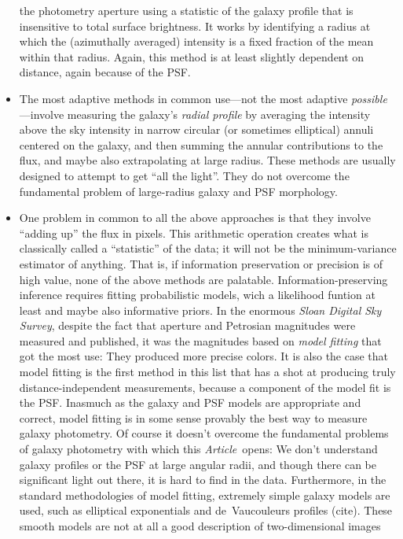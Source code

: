 \documentclass[12pt,preprint,pdftex]{aastex}
\newcommand{\project}[1]{\textsl{#1}}
\newcommand{\documentname}{\textsl{Article}}
\begin{document}
\begin{itemize}
  the photometry aperture using a statistic of the galaxy profile that
  is insensitive to total surface brightness.  It works by identifying
  a radius at which the (azimuthally averaged) intensity is a fixed
  fraction of the mean within that radius.  Again, this method is at
  least slightly dependent on distance, again because of the PSF.
\item The most adaptive methods in common use---not the most adaptive
  \emph{possible}---involve measuring the galaxy's \emph{radial
    profile} by averaging the intensity above the sky intensity in
  narrow circular (or sometimes elliptical) annuli centered on the
  galaxy, and then summing the annular contributions to the flux, and
  maybe also extrapolating at large radius.  These methods are usually
  designed to attempt to get ``all the light''.  They do not overcome
  the fundamental problem of large-radius galaxy and PSF morphology.
\item One problem in common to all the above approaches is that they
  involve ``adding up'' the flux in pixels.  This arithmetic operation
  creates what is classically called a ``statistic'' of the data; it
  will not be the minimum-variance estimator of anything.  That is, if
  information preservation or precision is of high value, none of the
  above methods are palatable.  Information-preserving inference
  requires fitting probabilistic models, wich a likelihood funtion at
  least and maybe also informative priors.  In the enormous
  \project{Sloan Digital Sky Survey}, despite the fact that aperture
  and Petrosian magnitudes were measured and published, it was the
  magnitudes based on \emph{model fitting} that got the most use: They
  produced more precise colors.  It is also the case that model
  fitting is the first method in this list that has a shot at
  producing truly distance-independent measurements, because a
  component of the model fit is the PSF.  Inasmuch as the galaxy and
  PSF models are appropriate and correct, model fitting is in some
  sense provably the best way to measure galaxy photometry.  Of course
  it doesn't overcome the fundamental problems of galaxy photometry
  with which this \documentname\ opens: We don't understand galaxy
  profiles or the PSF at large angular radii, and though there can be
  significant light out there, it is hard to find in the data.
  Furthermore, in the standard methodologies of model fitting,
  extremely simple galaxy models are used, such as elliptical
  exponentials and de~Vaucouleurs profiles (cite).  These smooth
  models are not at all a good description of two-dimensional images

\end{itemize}
\end{document}

